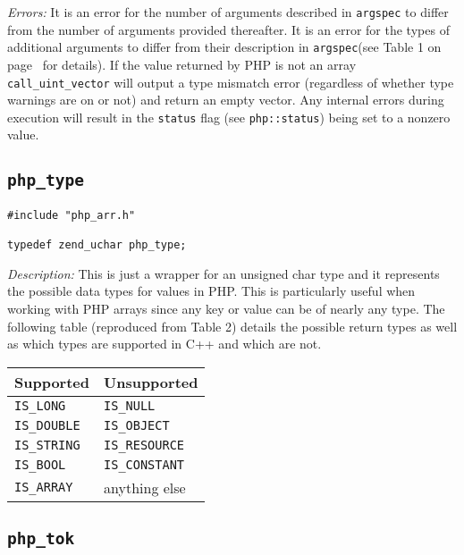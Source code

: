 \documentclass[11pt,titlepage]{article}
\begin{document}
\emph{Errors:} It is an error for the number of arguments described in \verb|argspec| to differ from the number of arguments provided thereafter. It is an error for the types of additional arguments to differ from their description in \verb|argspec|(see Table 1 on page~\pageref{Table1} for details). If the value returned by PHP is not an array \verb|call_uint_vector| will output a type mismatch error (regardless of whether type warnings are on or not) and return an empty vector. Any internal errors during execution will result in the \verb|status| flag (see \verb|php::status|) being set to a nonzero value.


\subsection{\texttt{php\_type}}

\begin{verbatim}
#include "php_arr.h"

typedef zend_uchar php_type;
\end{verbatim}

\emph{Description:} This is just a wrapper for an unsigned char type and it represents the possible data types for values in PHP. This is particularly useful when working with PHP arrays since any key or value can be of nearly any type. The following table (reproduced from Table 2) details the possible return types as well as which types are supported in C++ and which are not.

\begin{table}[!h]
\begin{center}
\begin{tabular}{l l}
Supported & Unsupported\\
\hline
\verb|IS_LONG| & \verb|IS_NULL|\\
\verb|IS_DOUBLE| & \verb|IS_OBJECT|\\
\verb|IS_STRING| & \verb|IS_RESOURCE|\\
\verb|IS_BOOL| & \verb|IS_CONSTANT|\\
\verb|IS_ARRAY| & anything else\\
\end{tabular}
\end{center}
\end{table}

\subsection{\texttt{php\_tok}}
\end{document}

